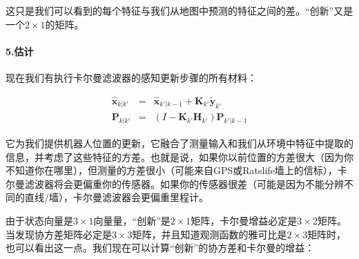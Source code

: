 这只是我们可以看到的每个特征与我们从地图中预测的特征之间的差。“创新”又是一个$2\times 1$的矩阵。


\paragraph{5.估计}
现在我们有执行卡尔曼滤波器的感知更新步骤的所有材料：

\begin{eqnarray}
\hat{\boldsymbol{x}}_{k|k'} &=& \hat{\boldsymbol{x}}_{k'|k-1} + \boldsymbol{K}_{k'}\tilde{\boldsymbol{y}}_{k'}\\
\boldsymbol{P}_{k|k'} &=& (I - \boldsymbol{K}_{k'} {\boldsymbol{H}_{k'}}) \boldsymbol{P}_{k'|k-1}
\end{eqnarray}


它为我们提供机器人位置的更新，它融合了测量输入和我们从环境中特征中提取的信息，并考虑了这些特征的方差。也就是说，如果你以前位置的方差很大（因为你不知道你在哪里），但测量的方差很小（可能来自GPS或Ratslife墙上的信标），卡尔曼滤波器将会更偏重你的传感器。如果你的传感器很差（可能是因为不能分辨不同的直线/墙），卡尔曼滤波器会更偏重里程计。


由于状态向量是$3\times 1$向量量，“创新”是$2\times 1$矩阵，卡尔曼增益必定是$3\times 2$矩阵。当发现协方差矩阵必定是$3\times 3$矩阵，并且知道观测函数的雅可比是$2\times 3$矩阵时，也可以看出这一点。我们现在可以计算“创新”的协方差和卡尔曼的增益：


